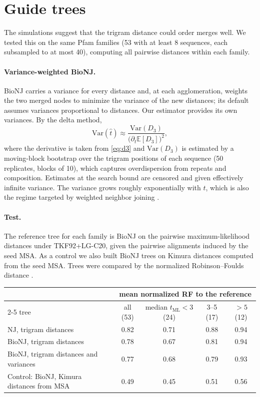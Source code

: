 \documentclass[11pt]{article}
\newcommand{\E}{\mathbb E}
\begin{document}
\section{Guide trees}

The simulations suggest that the trigram distance could order merges well.
We tested this on the same Pfam families (53 with at least 8 sequences, each
subsampled to at most 40), computing all pairwise distances within each
family.

\paragraph{Variance-weighted BioNJ.} BioNJ \citep{Gascuel1997} carries a
variance for every distance and, at each agglomeration, weights the two
merged nodes to minimize the variance of the new distances; its default
assumes variances proportional to distances. Our estimator provides its own
variances. By the delta method,
\[
\mathrm{Var}(\hat t)\approx\frac{\mathrm{Var}(D_3)}{\big(\partial_t\E[D_3]\big)^2},
\]
where the derivative is taken from \eqref{eq:d3} and $\mathrm{Var}(D_3)$ is
estimated by a moving-block bootstrap over the trigram positions of each
sequence (50 replicates, blocks of 10), which captures overdispersion from
repeats and composition. Estimates at the search bound are censored and
given effectively infinite variance. The variance grows roughly
exponentially with $t$, which is also the regime targeted by weighted
neighbor joining \citep{Bruno2000}.

\paragraph{Test.} The reference tree for each family is BioNJ on the pairwise
maximum-likelihood distances under TKF92+LG-C20, given the pairwise
alignments induced by the seed MSA. As a control we also built BioNJ trees on
Kimura distances computed from the seed MSA. Trees were compared by the
normalized Robinson--Foulds distance \citep{RobinsonFoulds1981}.

\begin{center}
\small
\begin{tabular}{lcccc}
\toprule
& \multicolumn{4}{c}{mean normalized RF to the reference}\\
\cmidrule(lr){2-5}
tree & all (53) & median $t_{\mathrm{ML}}<3$ (24) & 3--5 (17) & $>5$ (12)\\
\midrule
NJ, trigram distances              & 0.82 & 0.71 & 0.88 & 0.94\\
BioNJ, trigram distances           & 0.78 & 0.67 & 0.81 & 0.94\\
BioNJ, trigram distances and variances & 0.77 & 0.68 & 0.79 & 0.93\\
Control: BioNJ, Kimura distances from MSA & 0.49 & 0.45 & 0.51 & 0.56\\
\bottomrule
\end{tabular}
\end{center}
\end{document}
